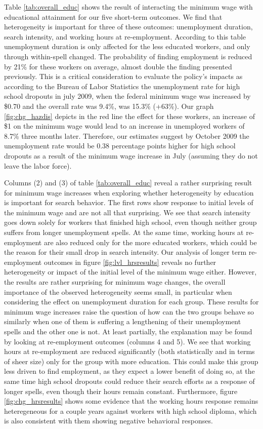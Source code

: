\documentclass{article}
\begin{document}
Table \ref{tab:overall_educ} shows the result of interacting the minimum wage with educational attainment for our five short-term outcomes. We find that heterogeneity is important for three of these outcomes: unemployment duration, search intensity, and working hours at re-employment. According to this table unemployment duration is only affected for the less educated workers, and only through within-spell changed. The probability of finding employment is reduced by 21\% for these workers on average, almost double the finding presented previously. This is a critical consideration to evaluate the policy's impacts as according to the Bureau of Labor Statistics the unemployment rate for high school dropouts in july 2009, when the federal minimum wage was increased by \$0.70 and the overall rate was 9.4\%, was 15.3\% (+63\%). Our graph \ref{fig:chg_hazdis} depicts in the red line the effect for these workers, an increase of \$1 on the minimum wage would lead to an increase in unemployed workers of 8.7\% three months later. Therefore, our estimates suggest by October 2009 the unemployment rate would be 0.38 percentage points higher for high school dropouts as a result of the minimum wage increase in July (assuming they do not leave the labor force).

Columns (2) and (3) of table \ref{tab:overall_educ} reveal a rather surprising result for minimum wage increases when exploring whether heterogeneity by education is important for search behavior. The first rows show response to initial levels of the minimum wage and are not all that surprising. We see that search intensity goes down solely for workers that finished high school, even though neither group suffers from longer unemployment spells. At the same time, working hours at re-employment are also reduced only for the more educated workers, which could be the reason for their small drop in search intensity. Our analysis of longer term re-employment outcomes in figure \ref{fig:lvl_hrsresults} reveals no further heterogeneity or impact of the initial level of the minimum wage either. However, the results are rather surprising for minimum wage changes, the overall importance of the observed heterogeneity seems small, in particular when considering the effect on unemployment duration for each group. These results for minimum wage increases raise the question of how can the two groups behave so similarly when one of them is suffering a lengthening of their unemployment spells and the other one is not. At least partially, the explanation may be found by looking at re-employment outcomes (columns 4 and 5). We see that working hours at re-employment are reduced significantly (both statistically and in terms of sheer size) only for the group with more education. This could make this group less driven to find employment, as they expect a lower benefit of doing so, at the same time high school dropouts could reduce their search efforts as a response of longer spells, even though their hours remain constant. Furthermore, figure \ref{fig:chg_hrsresults} shows some evidence that the working hours response remains heteregeneous for a couple years against workers with high school diploma, which is also consistent with them showing negative behavioral responses.
\end{document}
